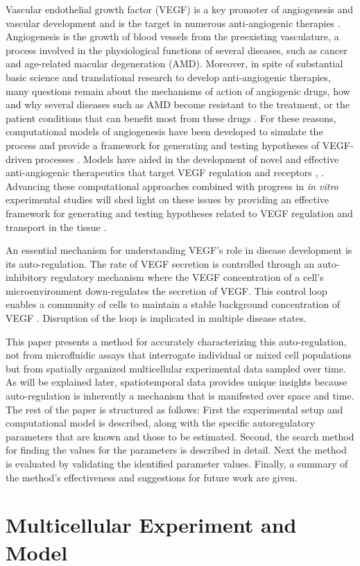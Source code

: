  Vascular endothelial growth factor (VEGF) is a key promoter of angiogenesis and vascular development and is the target in numerous anti-angiogenic therapies \cite{Carmeliet2000Angiogenesis}. Angiogenesis is the growth of blood vessels from the preexisting vasculature, a process involved in the physiological functions of several diseases, such as cancer and age-related macular degeneration (AMD). Moreover, in spite of substantial basic science and translational research to develop anti-angiogenic therapies, many questions remain about the mechanisms of action of angiogenic drugs, how and why several diseases such as AMD become resistant to the treatment, or the patient conditions that can benefit most from these drugs \cite{Bergers2008Modes}. For these reasons, computational models of angiogenesis have been developed to simulate the process and provide a framework for generating and testing hypotheses of VEGF-driven processes \cite{qanitabaker:MacGabhann2006Computational, qanitabaker:Stefanini2008Compartment, qanitabaker:Gabhann2012Simulating}. Models have aided in the development of novel and effective anti-angiogenic therapeutics that target VEGF regulation and receptors \cite{qanitabaker:Mahoney2012Multiobjective}, \cite{qanitabaker:Finley2013Compartment,qanitabaker:Yen2011TwoCompartment}. Advancing these computational approaches combined with progress in \textit{in vitro} experimental studies will shed light on these issues by providing an effective framework for generating and testing hypotheses related to VEGF regulation and transport in the tissue \cite{qanitabaker:Stefanini2008Compartment}.

 An essential mechanism for understanding VEGF's role in disease development is its auto-regulation. The rate of VEGF secretion is controlled through an auto-inhibitory regulatory mechanism where the VEGF concentration of a cell's microenvironment down-regulates the secretion of VEGF. This control loop enables a community of cells to maintain a stable background concentration of VEGF \cite{Takahashi2005Vascular}. Disruption of the loop is implicated in multiple disease states.

 This paper presents a method for accurately characterizing this auto-regulation, not from microfluidic assays that interrogate individual or mixed cell populations but from spatially organized multicellular experimental data sampled over time. As will be explained later, spatiotemporal data provides unique insights because auto-regulation is inherently a mechanism that is manifested over space and time. The rest of the paper is structured as follows: First the experimental setup and computational model is described, along with the specific autoregulatory parameters that are known and those to be estimated. Second, the search method for finding the values for the parameters is described in detail. Next the method is evaluated by validating the identified parameter values. Finally, a summary of the method's effectiveness and suggestions for future work are given.

\section{Multicellular Experiment and Model}





